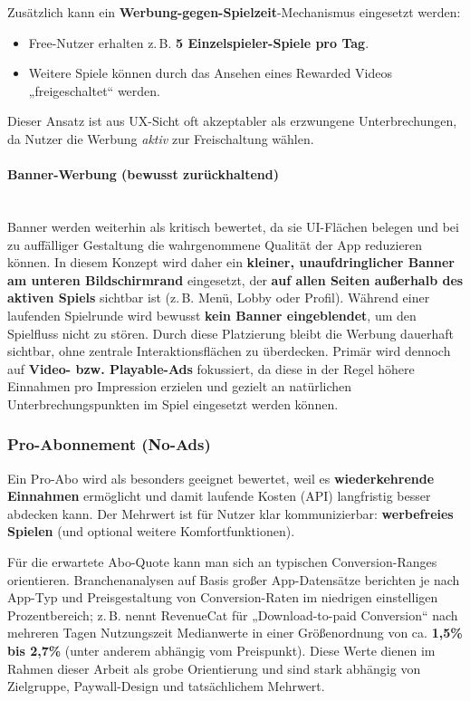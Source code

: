 Zusätzlich kann ein \textbf{Werbung-gegen-Spielzeit}-Mechanismus eingesetzt werden:
\begin{itemize}
    \item Free-Nutzer erhalten z.\,B. \textbf{5 Einzelspieler-Spiele pro Tag}.
    \item Weitere Spiele können durch das Ansehen eines Rewarded Videos „freigeschaltet“ werden.
\end{itemize}
Dieser Ansatz ist aus UX-Sicht oft akzeptabler als erzwungene Unterbrechungen, da Nutzer die Werbung \textit{aktiv} zur Freischaltung wählen.

\paragraph{Banner-Werbung (bewusst zurückhaltend)}
\mbox{}\\
Banner werden weiterhin als kritisch bewertet, da sie UI-Flächen belegen und bei zu auffälliger Gestaltung die wahrgenommene Qualität der App reduzieren können. In diesem Konzept wird daher ein \textbf{kleiner, unaufdringlicher Banner am unteren Bildschirmrand} eingesetzt, der \textbf{auf allen Seiten außerhalb des aktiven Spiels} sichtbar ist (z.\,B. Menü, Lobby oder Profil). Während einer laufenden Spielrunde wird bewusst \textbf{kein Banner eingeblendet}, um den Spielfluss nicht zu stören. Durch diese Platzierung bleibt die Werbung dauerhaft sichtbar, ohne zentrale Interaktionsflächen zu überdecken. Primär wird dennoch auf \textbf{Video- bzw. Playable-Ads} fokussiert, da diese in der Regel höhere Einnahmen pro Impression erzielen und gezielt an natürlichen Unterbrechungspunkten im Spiel eingesetzt werden können.
\subsubsection{Pro-Abonnement (No-Ads)}
Ein Pro-Abo wird als besonders geeignet bewertet, weil es \textbf{wiederkehrende Einnahmen} ermöglicht und damit laufende Kosten (API) langfristig besser abdecken kann. Der Mehrwert ist für Nutzer klar kommunizierbar: \textbf{werbefreies Spielen} (und optional weitere Komfortfunktionen).

Für die erwartete Abo-Quote kann man sich an typischen Conversion-Ranges orientieren. Branchenanalysen auf Basis großer App-Datensätze berichten je nach App-Typ und Preisgestaltung von Conversion-Raten im niedrigen einstelligen Prozentbereich; z.\,B. nennt RevenueCat für „Download-to-paid Conversion“ nach mehreren Tagen Nutzungszeit Medianwerte in einer Größenordnung von ca. \textbf{1{,}5\% bis 2{,}7\%} (unter anderem abhängig vom Preispunkt). \cite{RevenueCat_Subscriptions2025}
Diese Werte dienen im Rahmen dieser Arbeit als grobe Orientierung und sind stark abhängig von Zielgruppe, Paywall-Design und tatsächlichem Mehrwert.

